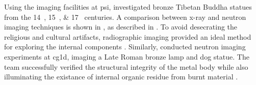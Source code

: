 \documentclass[../../../main.tex]{subfiles}%
\begin{document}
    Using the imaging facilities at \gls{psi}, \citeauthor*{Lehmann_2010} investigated bronze Tibetan Buddha statues from the \SIlist{14; 15; 17}{\thsuper} centuries. 
    A comparison between \gls{x-ray} and neutron imaging techniques is shown in , as described in .
    To avoid desecrating the religious and cultural artifacts, radiographic imaging provided an ideal method for exploring the internal components \cite{Lehmann_2010}.
    Similarly, \citeauthor*{Ryzewski_2013} conducted neutron imaging experiments at \gls{cg1d}, imaging a Late Roman bronze lamp and dog statue.
    The team successfully verified the structural integrity of the metal body while also illuminating the existance of internal organic residue from burnt material \cite{Ryzewski_2013}.
\end{document}
